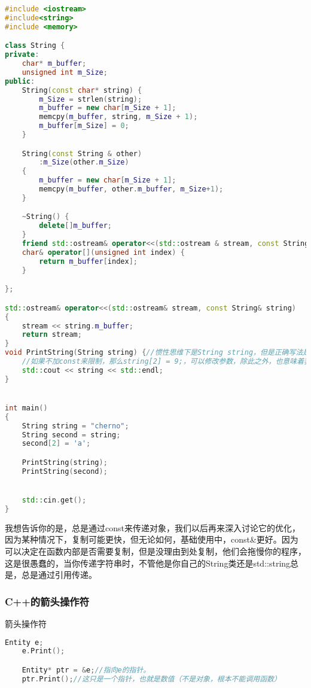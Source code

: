 \begin{lstlisting}[language=c++]
#include <iostream>
#include<string>
#include <memory>

class String {
private:
    char* m_buffer;
    unsigned int m_Size;
public:
    String(const char* string) {
        m_Size = strlen(string);
        m_buffer = new char[m_Size + 1];
        memcpy(m_buffer, string, m_Size + 1);
        m_buffer[m_Size] = 0;
    }

    String(const String & other)
        :m_Size(other.m_Size)
    {
        m_buffer = new char[m_Size + 1];
        memcpy(m_buffer, other.m_buffer, m_Size+1);
    }

    ~String() {
        delete[]m_buffer;
    }
    friend std::ostream& operator<<(std::ostream & stream, const String & string);
    char& operator[](unsigned int index) {
        return m_buffer[index];
    }

};

std::ostream& operator<<(std::ostream& stream, const String& string)
{
    stream << string.m_buffer;
    return stream;
}
void PrintString(String string) {//惯性思维下是String string，但是正确写法是const String& string，你可以在复制构造中打印标记来试试就知道了
    //如果不加const来限制，那么string[2] = 9;，可以修改参数，除此之外，也意味着我们可以将临时的右值，传到实际函数中去
    std::cout << string << std::endl;
}


int main()
{
    String string = "cherno";
    String second = string;
    second[2] = 'a';

    PrintString(string);
    PrintString(second);


    std::cin.get();
}
\end{lstlisting}

我想告诉你的是，总是通过{\ncodestyle const}来传递对象，我们以后再来深入讨论它的优化，因为某种情况下，复制可能更快，但无论如何，基础使用中，{\ncodestyle const\&}更好。因为可以决定在函数内部是否需要复制，但是没理由到处复制，他们会拖慢你的程序，这是很愚蠢的，当你传递字符串时，不管他是你自己的{\ncodestyle String}类还是{\ncodestyle std::string}总是，总是通过引用传递。

\subsubsection{C++的箭头操作符}

箭头操作符

\begin{lstlisting}[language=c++]
    Entity e;
    e.Print();

    Entity* ptr = &e;//指向e的指针。
    ptr.Print();//这只是一个指针，也就是数值（不是对象，根本不能调用函数）
\end{lstlisting}

